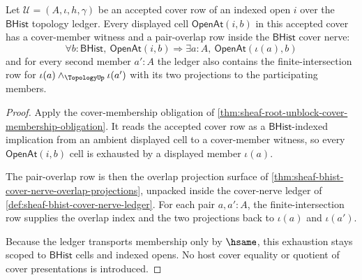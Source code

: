 \begin{theorem}
\label{thm:sheaf-root-cover-nerve-membership-exhaustion}
Let $\mathcal{U}=(A,\iota,h,\gamma)$ be an accepted cover row of an indexed open $i$ over the $\mathsf{BHist}$ topology ledger. Every displayed cell $\mathsf{OpenAt}(i,b)$ in this accepted cover has a cover-member witness and a pair-overlap row inside the $\mathsf{BHist}$ cover nerve:
$$
\forall b:\mathsf{BHist},\
\mathsf{OpenAt}(i,b)
\Longrightarrow
\exists a:A,\ \mathsf{OpenAt}(\iota(a),b)
$$
and for every second member $a':A$ the ledger also contains the finite-intersection row for $\iota(a)\wedge_{\TopologyUp}\iota(a')$ with its two projections to the participating members.
\end{theorem}
\begin{proof}
Apply the cover-membership obligation of \autoref{thm:sheaf-root-unblock-cover-membership-obligation}. It reads the accepted cover row as a $\mathsf{BHist}$-indexed implication from an ambient displayed cell to a cover-member witness, so every $\mathsf{OpenAt}(i,b)$ cell is exhausted by a displayed member $\iota(a)$.

The pair-overlap row is then the overlap projection surface of \autoref{thm:sheaf-bhist-cover-nerve-overlap-projections}, unpacked inside the cover-nerve ledger of \autoref{def:sheaf-bhist-cover-nerve-ledger}. For each pair $a,a':A$, the finite-intersection row supplies the overlap index and the two projections back to $\iota(a)$ and $\iota(a')$.

Because the ledger transports membership only by $\hsame$, this exhaustion stays scoped to $\mathsf{BHist}$ cells and indexed opens. No host cover equality or quotient of cover presentations is introduced.
\end{proof}

